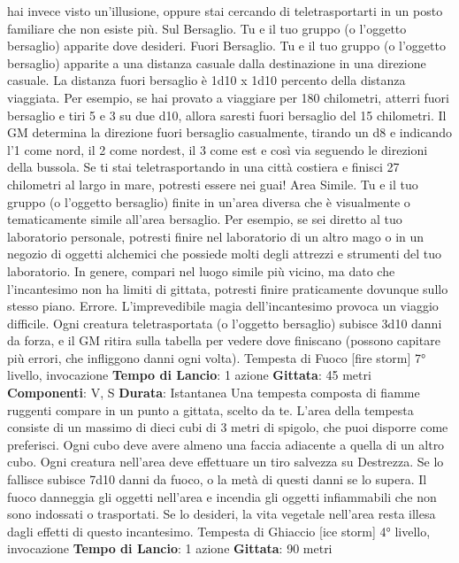 \begin{multicols}{2}
hai invece visto un’illusione, oppure stai cercando di
teletrasportarti in un posto familiare che non esiste più.
Sul Bersaglio. Tu e il tuo gruppo (o l’oggetto bersaglio)
apparite dove desideri.
Fuori Bersaglio. Tu e il tuo gruppo (o l’oggetto
bersaglio) apparite a una distanza casuale dalla
destinazione in una direzione casuale. La distanza fuori
bersaglio è 1d10 x 1d10 percento della distanza
viaggiata. Per esempio, se hai provato a viaggiare per
180 chilometri, atterri fuori bersaglio e tiri 5 e 3 su due
d10, allora saresti fuori bersaglio del 15%
chilometri. Il GM determina la direzione fuori bersaglio
casualmente, tirando un d8 e indicando l’1 come nord, il
2 come nordest, il 3 come est e così via seguendo le
direzioni della bussola. Se ti stai teletrasportando in una
città costiera e finisci 27 chilometri al largo in mare,
potresti essere nei guai!
Area Simile. Tu e il tuo gruppo (o l’oggetto bersaglio)
finite in un’area diversa che è visualmente o
tematicamente simile all’area bersaglio. Per esempio,
se sei diretto al tuo laboratorio personale, potresti finire
nel laboratorio di un altro mago o in un negozio di
oggetti alchemici che possiede molti degli attrezzi e
strumenti del tuo laboratorio. In genere, compari nel
luogo simile più vicino, ma dato che l’incantesimo non
ha limiti di gittata, potresti finire praticamente dovunque
sullo stesso piano.
Errore. L’imprevedibile magia dell’incantesimo provoca
un viaggio difficile. Ogni creatura teletrasportata (o
l’oggetto bersaglio) subisce 3d10 danni da forza, e il
GM ritira sulla tabella per vedere dove finiscano
(possono capitare più errori, che infliggono danni ogni
volta).
Tempesta di Fuoco
[fire storm]
7° livello, invocazione
\textbf{Tempo di Lancio}: 1 azione
\textbf{Gittata}: 45 metri
\textbf{Componenti}: V, S
\textbf{Durata}: Istantanea
Una tempesta composta di fiamme ruggenti compare in
un punto a gittata, scelto da te. L’area della tempesta
consiste di un massimo di dieci cubi di 3 metri di
spigolo, che puoi disporre come preferisci. Ogni cubo
deve avere almeno una faccia adiacente a quella di un
altro cubo. Ogni creatura nell’area deve effettuare un
tiro salvezza su Destrezza. Se lo fallisce subisce 7d10
danni da fuoco, o la metà di questi danni se lo supera.
Il fuoco danneggia gli oggetti nell’area e incendia gli
oggetti infiammabili che non sono indossati o
trasportati. Se lo desideri, la vita vegetale nell’area
resta illesa dagli effetti di questo incantesimo.
Tempesta di Ghiaccio
[ice storm]
4° livello, invocazione
\textbf{Tempo di Lancio}: 1 azione
\textbf{Gittata}: 90 metri

\end{multicols}
